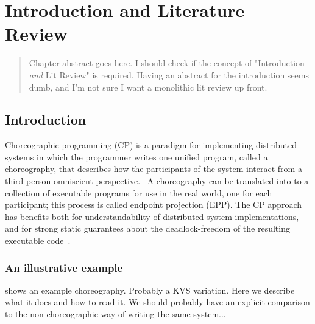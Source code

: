 \chapter{Introduction and Literature Review}

\begin{quote}
Chapter abstract goes here.
I should check if the concept of "Introduction \emph{and} Lit Review" is required.
Having an abstract for the introduction seems dumb, and I'm not sure I want a monolithic lit review up front.
\end{quote}

\section{Introduction}

Choreographic programming (CP)
is a paradigm for implementing distributed systems in which the programmer writes one unified program, called a choreography,
that describes how the participants of the system interact
from a third-person-omniscient perspective.~
A choreography can be translated into to a collection of executable programs for use in the real world, one for each participant;
this process is called endpoint projection (EPP).
The CP approach has benefits both for understandability of distributed system implementations,
and for strong static guarantees about the deadlock-freedom of the resulting executable code~\cite{montesi-carbone-dfbd}.

\subsection{An illustrative example}

 shows an example choreography.
Probably a KVS variation.
Here we describe what it does and how to read it.
We should probably have an explicit comparison to the non-choreographic way of writing the same system...

